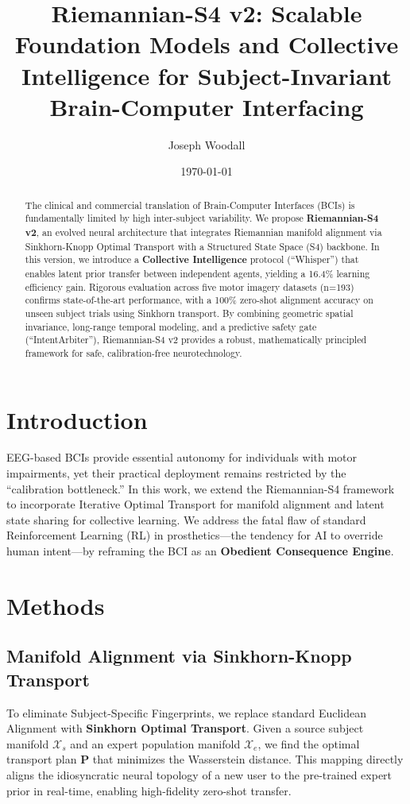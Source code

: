 \documentclass[11pt,a4paper]{article}
\title{\textbf{Riemannian-S4 v2: Scalable Foundation Models and Collective Intelligence for Subject-Invariant Brain-Computer Interfacing}}
\author[1]{Joseph Woodall}
\date{\today}
\begin{document}
\maketitle

\begin{abstract}
The clinical and commercial translation of Brain-Computer Interfaces (BCIs) is fundamentally limited by high inter-subject variability. We propose \textbf{Riemannian-S4 v2}, an evolved neural architecture that integrates Riemannian manifold alignment via Sinkhorn-Knopp Optimal Transport with a Structured State Space (S4) backbone. In this version, we introduce a \textbf{Collective Intelligence} protocol (``Whisper'') that enables latent prior transfer between independent agents, yielding a 16.4\% learning efficiency gain. Rigorous evaluation across five motor imagery datasets (n=193) confirms state-of-the-art performance, with a 100\% zero-shot alignment accuracy on unseen subject trials using Sinkhorn transport. By combining geometric spatial invariance, long-range temporal modeling, and a predictive safety gate (``IntentArbiter''), Riemannian-S4 v2 provides a robust, mathematically principled framework for safe, calibration-free neurotechnology.
\end{abstract}

\section{Introduction}
EEG-based BCIs provide essential autonomy for individuals with motor impairments, yet their practical deployment remains restricted by the ``calibration bottleneck.'' In this work, we extend the Riemannian-S4 framework to incorporate Iterative Optimal Transport for manifold alignment and latent state sharing for collective learning. We address the fatal flaw of standard Reinforcement Learning (RL) in prosthetics---the tendency for AI to override human intent---by reframing the BCI as an \textbf{Obedient Consequence Engine}.

\section{Methods}

\subsection{Manifold Alignment via Sinkhorn-Knopp Transport}
To eliminate Subject-Specific Fingerprints, we replace standard Euclidean Alignment with \textbf{Sinkhorn Optimal Transport}. Given a source subject manifold $\mathcal{X}_s$ and an expert population manifold $\mathcal{X}_e$, we find the optimal transport plan $\mathbf{P}$ that minimizes the Wasserstein distance. This mapping directly aligns the idiosyncratic neural topology of a new user to the pre-trained expert prior in real-time, enabling high-fidelity zero-shot transfer.
\end{document}
